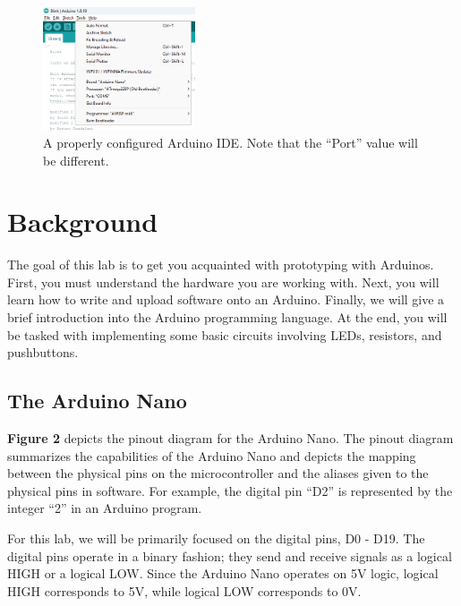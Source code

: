 \documentclass{article}
\begin{document}
\begin{figure}[ht]
    \centering
    \includegraphics[width = 0.4\textwidth]{images/ArduinoReady.png}
    \cprotect\caption{A properly configured Arduino IDE. Note that the ``Port'' value will be different.}
\end{figure}

\newpage

\section{Background}

The goal of this lab is to get you acquainted with prototyping with Arduinos. First, you must understand the hardware you are working with. Next, you will learn how to write and upload software onto an Arduino. Finally, we will give a brief introduction into the Arduino programming language. At the end, you will be tasked with implementing some basic circuits involving LEDs, resistors, and pushbuttons.

\subsection{The Arduino Nano}

{\bf Figure 2} depicts the pinout diagram for the Arduino Nano. The pinout diagram summarizes the capabilities of the Arduino Nano and depicts the mapping between the physical pins on the microcontroller and the aliases given to the physical pins in software. For example, the digital pin ``D2'' is represented by the integer ``2'' in an Arduino program. \par

For this lab, we will be primarily focused on the digital pins, D0 - D19. The digital pins operate in a binary fashion; they send and receive signals as a logical HIGH or a logical LOW. Since the Arduino Nano operates on 5V logic, logical HIGH corresponds to 5V, while logical LOW corresponds to 0V. \par
\end{document}
